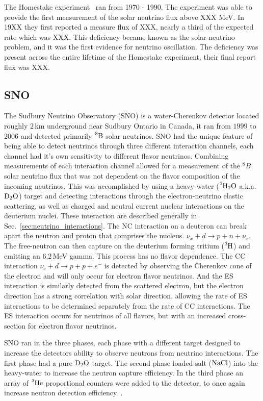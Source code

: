 The Homestake experiment~\cite{homestake} ran from 1970 - 1990. %
The experiment was able to provide the first measurement of the solar neutrino
flux above XXX MeV. In 19XX they first reported a measure flux of
XXX, nearly a third of the expected rate which was XXX.
This deficiency became known as the solar neutrino problem, and it
was the first evidence for neutrino oscillation.
The deficiency was present across the entire lifetime of the Homestake experiment,
their final report flux was XXX.

\subsection{SNO}
\label{sec:sno}
The Sudbury Neutrino Observatory (SNO) is a water-Cherenkov detector located
roughly $2$\,km underground near Sudbury Ontario in Canada, it ran from
$1999$ to $2006$ and detected primarily $\ce{^{8}B}$ solar neutrinos.
SNO had the unique feature of
being able to detect neutrinos through three different interaction channels,
each channel had it's own sensitivity to different flavor neutrinos.
Combining measurements of each interaction channel allowed for a measurement of the $^8B$
solar neutrino flux that was not dependent on the flavor composition of the
incoming neutrinos.
This was accomplished by using a heavy-water ($\ce{^{2}H_{2}O}$ a.k.a. $\ce{D_{2}O}$) target and
detecting interactions through the electron-neutrino elastic scattering,
as well as charged and neutral current nuclear interactions on the deuterium
nuclei.
These interaction are described generally in Sec.~\ref{sec:neutrino_interactions}.
The NC interaction on a deuteron can break apart the neutron and proton
that comprises the nucleus. $\nu_{x} + d \rightarrow p + n + \nu_{x}$.
The free-neutron can then capture on the deuterium forming tritium ($\ce{^{3}H}$)
and emitting an $6.2$\,MeV gamma.
This process has no flavor dependence.
The CC interaction $\nu_{e} + d \rightarrow p + p + e^{-}$
is detected by observing the Cherenkov cone of the electron and will only
occur for electron flavor neutrinos.
And the ES interaction is similarly detected from the scattered electron,
but the electron direction has a strong correlation with solar direction,
allowing the rate of ES interactions to be determined separately from the
rate of CC interactions.
The ES interaction occurs for neutrinos of all flavors, but with an increased
cross-section for electron flavor neutrinos.

SNO ran in the three phases, each phase with a different target
designed to increase the detectors ability to observe neutrons from neutrino
interactions.
The first phase had a pure $\ce{D_{2}O}$ target.
 The second phase loaded salt ($\ce{NaCl}$) into the heavy-water to increase
the neutron capture efficiency.
In the third phase an array of $\ce{^{3}He}$ proportional counters were added
to the detector, to once again increase neutron detection efficiency~\cite{sno_review}.

